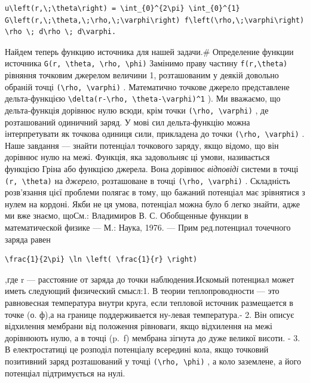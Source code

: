 \documentclass[
  ukrainian,
]{article}
\begin{document}
\begin{verbatim}
u\left(r,\;\theta\right) = \int_{0}^{2\pi} \int_{0}^{1} G\left(r,\;\theta,\;\rho,\;\varphi\right) f\left(\rho,\;\varphi\right) \rho \; d\rho \; d\varphi.
\end{verbatim}

Найдем теперь функцию источника для нашей задачи.\# Определение функции
источника
\texttt{G(r,\ \textbackslash{}theta,\ \textbackslash{}rho,\ \textbackslash{}phi)}
Замінимо праву частину \texttt{f(r,\textbackslash{}theta)} рівняння
точковим джерелом величини 1, розташованим у деякій довольно обраній
точці \texttt{(\textbackslash{}rho,\ \textbackslash{}varphi)} .
Математично точкове джерело представлене дельта-функцією
\texttt{\textbackslash{}delta(r-\textbackslash{}rho,\ \textbackslash{}theta-\textbackslash{}varphi)\^{}1}
). Ми вважаємо, що дельта-функція дорівнює нулю всюди, крім точки
\texttt{(\textbackslash{}rho,\ \textbackslash{}varphi)} , де
розташований одиничний заряд. У мові сил дельта-функцію можна
інтерпретувати як точкова одиниця сили, прикладена до точки
\texttt{(\textbackslash{}rho,\ \textbackslash{}varphi)} . Наше завдання
--- знайти потенціал точкового заряду, якщо відомо, що він дорівнює нулю
на межі. Функція, яка задовольняє ці умови, називається функцією Гріна
або функцією джерела. Вона дорівнює \emph{відповіді} системи в точці
\texttt{(r,\ \textbackslash{}theta)} на \emph{джерело}, розташоване в
точці \texttt{(\textbackslash{}rho,\ \textbackslash{}varphi)} .
Складність розв'язання цієї проблеми полягає в тому, що бажаний
потенціал має зрівнятися з нулем на кордоні. Якби не ця умова, потенціал
можна було б легко знайти, адже ми вже знаємо, щоСм.: Владимиров В. С.
Обобщенные функции в математической физике --- М.: Наука, 1976. --- Прим
ред.потенциал точечного заряда равен

\begin{verbatim}
\frac{1}{2\pi} \ln \left( \frac{1}{r} \right)
\end{verbatim}

,где r --- расстояние от заряда до точки наблюдения.Искомый потенциал
может иметь следующий физический смысл:1. В теории теплопроводности ---
это равновесная температура внутри круга, если тепловой источник
размещается в точке (о. ф),а на границе поддерживается ну-левая
температура.- 2. Він описує відхилення мембрани від положення рівноваги,
якщо відхилення на межі дорівнюють нулю, а в точці (p.~f) мембрана
зігнута до дуже великої висоти. - 3. В електростатиці це розподіл
потенціалу всередині кола, якщо точковий позитивний заряд розташований у
точці \texttt{(\textbackslash{}rho,\ \textbackslash{}phi)} , а коло
заземлене, а його потенціал підтримується на нулі.
\end{document}
